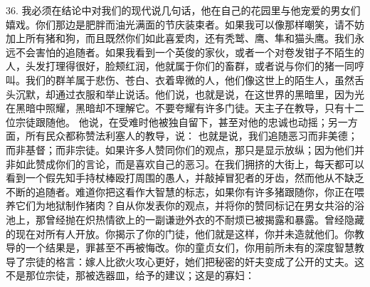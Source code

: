 36. 我必须在结论中对我们的现代说几句话，他在自己的花园里与他宠爱的男女们嬉戏。你们那边是肥胖而油光满面的节庆装束者。如果我可以像那样嘲笑，请不妨加上所有猪和狗，而且既然你们如此喜爱肉，还有秃鹫、鹰、隼和猫头鹰。我们永远不会害怕的追随者。如果我看到一个英俊的家伙，或者一个对卷发钳子不陌生的人，头发打理得很好，脸颊红润，他就属于你们的畜群，或者说与你们的猪一同哼叫。我们的群羊属于悲伤、苍白、衣着卑微的人，他们像这世上的陌生人，虽然舌头沉默，却通过衣服和举止说话。他们说，也就是说，在这世界的黑暗里，因为光在黑暗中照耀，黑暗却不理解它。不要夸耀有许多门徒。天主子在教导，只有十二位宗徒跟随他。 他说，在受难时他被独自留下，甚至对他的忠诚也动摇；另一方面，所有民众都称赞法利塞人的教导，说： 也就是说，我们追随恶习而非美德；而非基督；而非宗徒。如果许多人赞同你们的观点，那只是显示放纵；因为他们并非如此赞成你们的言论，而是喜欢自己的恶习。在我们拥挤的大街上，每天都可以看到一个假先知手持杖棒殴打周围的愚人，并敲掉冒犯者的牙齿，然而他从不缺乏不断的追随者。难道你把这看作大智慧的标志，如果你有许多猪跟随你，你正在喂养它们为地狱制作猪肉？自从你发表你的观点，并将你的赞同标记在男女共浴的浴池上，那曾经抛在炽热情欲上的一副谦逊外衣的不耐烦已被揭露和暴露。曾经隐藏的现在对所有人开放。你揭示了你的门徒，他们就是这样，你并未造就他们。你教导的一个结果是，罪甚至不再被悔改。你的童贞女们，你用前所未有的深度智慧教导了宗徒的格言：嫁人比欲火攻心更好，她们把秘密的奸夫变成了公开的丈夫。这不是那位宗徒，那被选器皿，给予的建议；这是的寡妇：\par

\par


